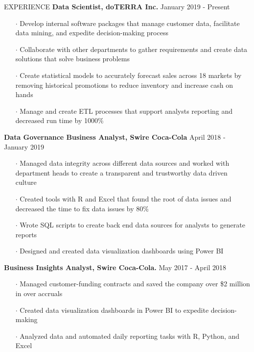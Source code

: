 \documentclass{resume} %
\begin{document}
    
      \begin{rSection}{EXPERIENCE}
    {\bf Data Scientist, doTERRA Inc.} \hfill {January 2019 - Present}
    \begin{itemize}[noitemsep]
      
      \item[$\cdot$] Develop internal software packages that manage customer data, facilitate data mining, and expedite decision-making process
      \item[$\cdot$] Collaborate with other departments to gather requirements and create data solutions that solve business problems
      \item[$\cdot$] Create statistical models to accurately forecast sales across 18 markets by removing historical promotions to reduce inventory and increase cash on hands
      \item[$\cdot$] Manage and create ETL processes that support analysts reporting and decreased run time by 1000\%
    \end{itemize}
    {\bf Data Governance Business Analyst, Swire Coca-Cola} \hfill {April 2018 - January 2019}
    \begin{itemize}[noitemsep]
      \item[$\cdot$] Managed data integrity across different data sources and worked with department heads to create a transparent   and trustworthy data driven culture
      \item[$\cdot$] Created tools with R and Excel that found the root of data issues and decreased the time to fix data issues by 80\%
      \item[$\cdot$] Wrote SQL scripts to create back end data sources for analysts to generate reports
      \item[$\cdot$] Designed and created data visualization dashboards using Power BI
    \end{itemize}
    {\bf Business Insights Analyst, Swire Coca-Cola.} \hfill {May 2017 - April 2018}
    \begin{itemize}[noitemsep]
      \item[$\cdot$] Managed customer-funding contracts and saved the company over \$2 million in over accruals
      \item[$\cdot$] Created data visualization dashboards in Power BI to expedite decision-making
      \item[$\cdot$] Analyzed data and automated daily reporting tasks with R, Python, and Excel

\end{itemize}
\end{rSection}
\end{document}
